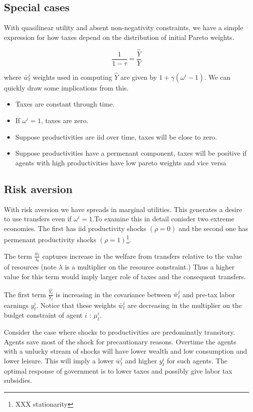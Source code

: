 \documentclass[thmsb,11pt]{article}
\begin{document}
\subsection{Special cases}
With quasilinear utility and absent non-negativity constraints, we have a simple expression for how taxes depend on the distribution of initial Pareto weights.

 
\begin{equation}
	\label{eq-ql-taxes}
\frac{1}{1-\tau}=\frac{\hat{Y}}{Y}	
\end{equation}   

where $\bar{w}^{i}_t$ weights used in computing $\hat{Y}$ are given by $1+\gamma(\omega^i-1)$. We can quickly draw some implications from this. 
\begin{itemize}
\item Taxes are constant through time.
\item If $\omega^i=1$, taxes are zero.
\item Suppose productivities are iid over time,  taxes will be close to zero.
\item Suppose productivities have a permenant component, taxes will be positive if agents with high productivities have low pareto weights and vice versa
\end{itemize}
\subsection{Risk aversion}


With risk aversion we have spreads in marginal utilities. This generates a desire to use transfers even if $\omega^i=1$.To examine this in detail conisder two extreme economies. The first has iid productivity shocks $(\rho=0)$ and the second one has permenant productivity shocks $(\rho=1)$\footnote{XXX stationarity}.


The term  $\frac{\bar{w}_t }{\lambda_t}$ captures increase in the welfare from transfers relative to the value of resources (note $\lambda$ is a multiplier on the resource constraint.) Thus a higher value for this term would imply larger role of taxes and the consequent transfers. 

The first term $\frac{\hat{Y_t}}{Y_t}$ is increasing in the covariance between $\bar{w}^i_t$ and pre-tax  labor earnings $y^i_t$. Notice that these weights $\bar{w}^i_t$ are decreasing in the multiplier on the budget constraint of agent $i$ : $\mu_t^i$. 

Consider the case where shocks to productivities are predominatly transitory.   Agents save most of the shock for precautionary reasons. Overtime the agents with a unlucky stream of shocks will have lower wealth and low consumption and lower leisure. This will imply a lower $\bar{w}^i_t$ and higher $y^i_t$ for such agents. The optimal response of government is to lower taxes and possibly give labor tax subsidies. 
\end{document}
